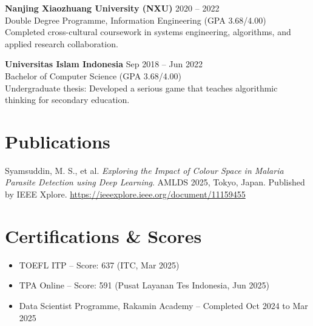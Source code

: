 \documentclass[10pt,a4paper]{article}
\begin{document}
\textbf{Nanjing Xiaozhuang University (NXU)} \hfill 2020 -- 2022\\
Double Degree Programme, Information Engineering (GPA 3.68/4.00)\\
Completed cross-cultural coursework in systems engineering, algorithms, and applied research collaboration.

\textbf{Universitas Islam Indonesia} \hfill Sep 2018 -- Jun 2022\\
Bachelor of Computer Science (GPA 3.68/4.00)\\
Undergraduate thesis: Developed a serious game that teaches algorithmic thinking for secondary education.

\section*{Publications}
Syamsuddin, M. S., et al. \textit{Exploring the Impact of Colour Space in Malaria Parasite Detection using Deep Learning}. AMLDS 2025, Tokyo, Japan. Published by IEEE Xplore. \href{https://ieeexplore.ieee.org/document/11159455}{https://ieeexplore.ieee.org/document/11159455}

\section*{Certifications \& Scores}
\begin{itemize}
  \item TOEFL ITP -- Score: 637 (ITC, Mar 2025)
  \item TPA Online -- Score: 591 (Pusat Layanan Tes Indonesia, Jun 2025)
  \item Data Scientist Programme, Rakamin Academy -- Completed Oct 2024 to Mar 2025
\end{itemize}
\end{document}
